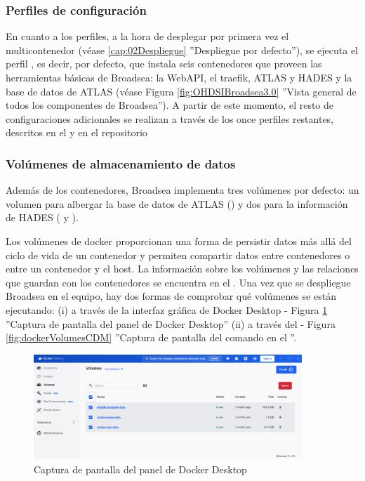 \subsubsection{Perfiles de configuración} 

En cuanto a los perfiles, a la hora de desplegar por primera vez el multicontenedor (véase \ref{cap:02Despliegue} ''Despliegue por defecto''), se ejecuta el perfil , es decir, por defecto, que instala seis contenedores que proveen las herramientas básicas de Broadsea:  la WebAPI, el traefik, ATLAS y HADES y la base de datos de ATLAS (véase Figura \ref{fig:OHDSIBroadsea3.0} ''Vista general de todos los componentes de Broadsea''). A partir de este momento, el resto de configuraciones adicionales se realizan a través de los once perfiles restantes, descritos en el  y en el repositorio \cite{githubBroadsea}

\subsubsection{Volúmenes de almacenamiento de datos}

Además de los contenedores, Broadsea implementa tres volúmenes por defecto: un volumen para albergar la base de datos de ATLAS () y dos para la información de HADES ( y ). 

Los volúmenes de docker proporcionan una forma de persistir datos más allá del ciclo de vida de un contenedor y permiten compartir datos entre contenedores o entre un contenedor y el host. La información sobre los volúmenes y las relaciones que guardan con los contenedores se encuentra en el . Una vez que se despliegue Broadsea en el equipo, hay dos formas de comprobar qué volúmenes se están ejecutando: (i) a través de la interfaz gráfica de Docker Desktop - Figura \ref{fig:dockerVolumes} ''Captura de pantalla del panel  de Docker Desktop'' (ii) a través del  - Figura \ref{fig:dockerVolumesCDM} ''Captura de pantalla del comando  en el ''.

\begin{figure}[H]
    \centering
    \includegraphics[width=0.90\textwidth]{figures/dockerVolumes.png}
     \caption{Captura de pantalla del panel  de Docker Desktop}
    \label{fig:dockerVolumes}
\end{figure}

